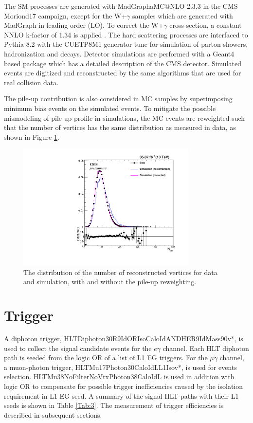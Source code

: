 \documentclass[thesis.tex]{subfiles}
\renewcommand\_{\textunderscore\allowbreak}
\begin{document}
The SM processes are generated with MadGraph\_aMC@NLO 2.3.3 in the CMS Moriond17 campaign, except for the W+$\gamma$ samples which are generated with MadGraph in leading order (LO). 
To correct the W+$\gamma$ cross-section, a constant NNLO k-factor of 1.34 is applied \cite{K:MonoPho, K:Bozzi}. 
The hard scattering processes  are interfaced to Pythia 8.2 with the CUETP8M1 generator tune for simulation of parton showers,  hadronization and decays. 
Detector simulations are performed with a Geant4 based package which has a detailed description of the CMS detector. 
Simulated events are digitized and reconstructed by the same algorithms that are used for real collision data. 

The pile-up contribution is also considered in MC samples by superimposing minimum bias events on the simulated events. 
To mitigate the possible mismodeling of pile-up profile in simulations, the MC events are reweighted such that the number of vertices has the same distribution as measured in data, as shown in Figure \ref{fig:PUreweight}.

\begin{figure}[h]
  \centering
    \includegraphics[width=0.8\textwidth]{Figures/PLOT_PUreweight.pdf}
  \caption{The distribution of the number of reconstructed vertices for data and simulation, with and without the pile-up reweighting.}
  \label{fig:PUreweight}
\end{figure}


\section{Trigger}
\label{sec:trigger}
A diphoton trigger, HLT\_Diphoton30\_18\_R9Id\_OR\_IsoCaloId\_AND\_HE\_R9Id\_Mass90\_v*, is used to collect the signal candidate events for the $e\gamma$ channel. Each HLT diphoton path is seeded from the logic OR of a list of L1 EG triggers.
For the $\mu\gamma$ channel, a muon-photon trigger, HLT\_Mu17\_Photon30\_CaloIdL\_L1Iso\_v*, is used for events selection. 
HLT\_Mu38NoFilterNoVtx\_Photon38\_CaloIdL is used in addition with logic OR to compensate for possible trigger inefficiencies caused by the isolation requirement in L1 EG seed. 
A summary of the signal HLT paths with their L1 seeds is shown in Table \ref{Tab:3}. 
The measurement of trigger efficiencies is described in subsequent sections.
\end{document}
